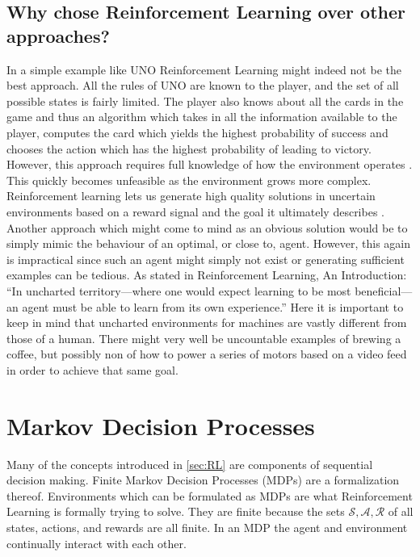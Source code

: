 \subsection*{Why chose Reinforcement Learning over other approaches?}\label{subsec:Why_RL}
In a simple example like UNO Reinforcement Learning might indeed not be the best approach. All the rules of UNO are known to the player, and the set of all possible states is fairly limited. The player also knows about all the cards in the game and thus an algorithm which takes in all the information available to the player, computes the card which yields the highest probability of success and chooses the action which has the highest probability of leading to victory. However, this approach requires full knowledge of how the environment operates \cite[p. 8]{sutton_reinforcement_2018}. This quickly becomes unfeasible as the environment grows more complex. Reinforcement learning lets us generate high quality solutions in uncertain environments based on a reward signal and the goal it ultimately describes \cite[p. 03]{sutton_reinforcement_2018}. Another approach which might come to mind as an obvious solution would be to simply mimic the behaviour of an optimal, or close to, agent. However, this again is impractical since such an agent might simply not exist or generating sufficient examples can be tedious. As stated in Reinforcement Learning, An Introduction: “In uncharted territory—where one would expect learning to be most beneficial—an agent must be able to learn from its own experience.” \cite[p. 02]{sutton_reinforcement_2018} Here it is important to keep in mind that uncharted environments for machines are vastly different from those of a human. There might very well be uncountable examples of brewing a coffee, but possibly non of how to power a series of motors based on a video feed in order to achieve that same goal.
\newpage
\section{Markov Decision Processes}\label{sec:MDP} %
Many of the concepts introduced in \ref{sec:RL} are components of sequential decision making. Finite Markov Decision Processes (MDPs) are a formalization thereof. Environments which can be formulated as MDPs are what Reinforcement Learning is formally trying to solve. They are finite because the sets $\mathscr{S}, \mathscr{A}, \mathscr{R}$ of all states, actions, and rewards are all finite. In an MDP the agent and environment continually interact with each other. 

